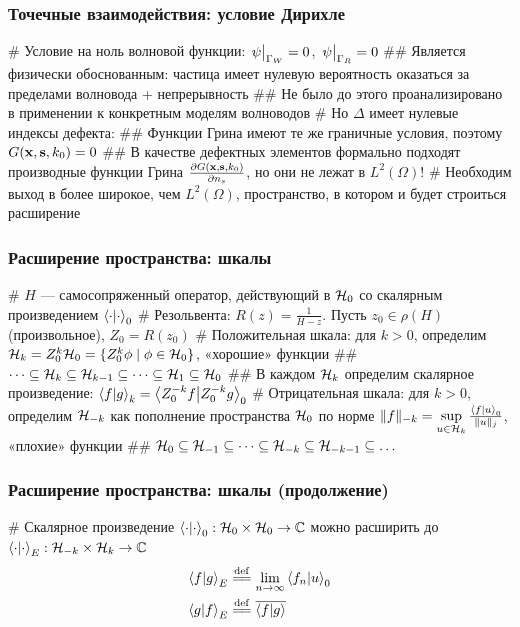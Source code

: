 \documentclass{beamer}
\begin{document}
\begin{frame}[fragile]
\frametitle{Точечные взаимодействия: условие Дирихле}
\begin{easylist}[itemize]
# Условие на ноль волновой функции: $\eval{\psi}_{\Gamma_W} = 0$, $\eval{\psi}_{\Gamma_R} = 0$
## Является физически обоснованным: частица имеет нулевую вероятность оказаться за пределами волновода + непрерывность
## Не было до этого проанализировано в применении к конкретным моделям волноводов
# Но $\Delta$ имеет нулевые индексы дефекта:
## Функции Грина имеют те же граничные условия, поэтому $G(\vb{x}, \vb{s}, k_0) = 0$
## В качестве дефектных элементов формально подходят производные функции Грина $\pdv{G(\vb{x}, \vb{s}, k_0)}{n_s}$, но они не лежат в $L^2(\Omega)$!
# Необходим выход в более широкое, чем $L^2(\Omega)$, пространство, в котором и будет строиться расширение
\end{easylist}
\end{frame}


\begin{frame}[fragile]
\frametitle{Расширение пространства: шкалы}
\begin{easylist}[itemize]
# $H$ — самосопряженный оператор, действующий в $\mathcal{H}_{0}$ со скалярным произведением $\ip{\cdot}{\cdot}_0$
# Резольвента: $R(z) = \frac{1}{H - z}$. Пусть $z_0 \in \rho(H)$ (произвольное), $Z_0 = R(z_0)$
# Положительная шкала: для $k > 0$, определим $\mathcal{H}_{k} = Z_0^k \mathcal{H}_{0} = \{ Z_0^k \phi \mid \phi \in \mathcal{H}_{0} \}$, «хорошие» функции
## $\dots \subseteq \mathcal{H}_{k} \subseteq \mathcal{H}_{k - 1} \subseteq \dots \subseteq \mathcal{H}_{1} \subseteq \mathcal{H}_{0}$
## В каждом $\mathcal{H}_{k}$ определим скалярное произведение: $\ip{f}{g}_k = \ip{Z_0^{-k} f}{Z_0^{-k} g}_0$
# Отрицательная шкала: для $k > 0$, определим $\mathcal{H}_{-k}$ как пополнение пространства $\mathcal{H}_{0}$ по норме $\|f \|_{-k} = \sup\limits_{u \in \hilb{k}} \frac{\ip{f}{u}_0}{\|u\|_j}$, «плохие» функции
## $\mathcal{H}_{0} \subseteq \mathcal{H}_{-1} \subseteq \dots \subseteq \mathcal{H}_{-k} \subseteq \mathcal{H}_{-k - 1} \subseteq \dots $
\end{easylist}
\end{frame}


\begin{frame}[fragile]
\frametitle{Расширение пространства: шкалы (продолжение)}
\begin{easylist}[itemize]
# Скалярное произведение $\ip{\cdot}{\cdot}_0: \hilb{0} \times \hilb{0} \to \bbC$ можно расширить до $\ip{\cdot}{\cdot}_E: \hilb{-k} \times \hilb{k} \to \bbC$
\begin{align*}
\ip{f}{g}_E &\eqdef \lim\limits_{n \to \infty} \ip{f_n}{u}_0 \\
\ip{g}{f}_E &\eqdef \cconj{\ip{f}{g}}
\end{align*}
\end{easylist}
\end{frame}
\end{document}
